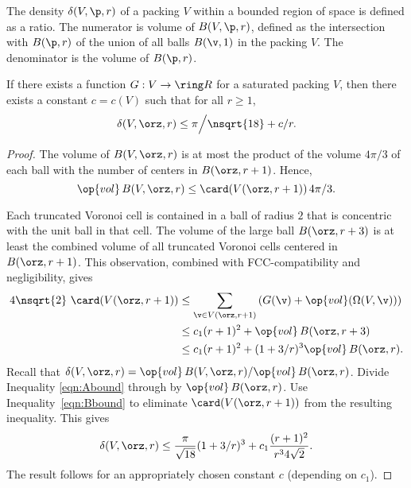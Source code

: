 \begin{cnl}
The density $\delta( V,\p,r)$ of a packing $ V$ within a bounded
region of space is defined as a ratio. The numerator is volume of
$\openBall{V}{\p,r}$, defined as the intersection with $\openBall{\p}{r}$ of the union
of all balls $\openBall{\v}{1}$ in the packing $V$.  The denominator is the volume of
$\openBall{\p}{r}$. 
%
%



\begin{lemma}
\label{lemma:reduction-finite-dimensions} %
% 
If there exists a 
 function $G: V\to\Real$ for
a saturated packing $ V$, then there exists a constant $c=c(V)$ such
that for all $r\ge1$,
\[  
\delta( V,\orz,r)
\le {\pi}\Big/{\nsqrt{18}} + c/r.
\] 
\end{lemma}


\begin{proof} 
The volume of $\openBall{ V}{\orz,r}$ is at most the product of the volume
$4\pi/3$ of each ball with the number of centers in
$\openBall{\orz}{r+1}$.  Hence,
\begin{equation} \label{eqn:Abound}
\op{vol}\, \openBall{ V}{\orz,r} \le \card( \Vee{V}(\orz,r+1))\, 4\pi/3.
\end{equation}


Each truncated Voronoi cell is contained in a ball of radius $2$ that
is concentric with the unit ball in that cell.  The volume of the
large ball $\openBall{\orz}{r+3}$ is at least the combined volume of all
truncated Voronoi cells centered in $\openBall{\orz}{r+1}$. This observation,
combined with FCC-compatibility and negligibility, gives
\begin{equation} 
\begin{split} 
4\nsqrt{2}\,\,\card( \Vee{V}(\orz,r+1))
&\le \sumfinitepred{\v}{\v\in \Vee{V}(\orz,r+1)}{\left(G(\v) +
\op{vol}(\Omega(V,\v))\right)} \\
&\le c_1 (r+1)^2 + \op{vol}\,\openBall{\orz}{r+3} \\
&\le c_1 (r+1)^2 + (1+3/r)^3 \op{vol}\,\openBall{\orz}{r}.
\label{eqn:Bbound}
\end{split}
\end{equation}
%
Recall that $\delta( V,\orz,r)=
\op{vol}\,\openBall{ V}{\orz,r}/\op{vol}\,\openBall{\orz}{r}$. Divide Inequality
\ref{eqn:Abound} through by $\op{vol}\,\openBall{\orz}{r}$.  Use
Inequality~\ref{eqn:Bbound} to eliminate $\card( \Vee{V}(\orz,r+1))$ from the
resulting inequality.  This gives
\[ \delta( V,\orz,r)
\le \frac{\pi}{\sqrt{18}} (1+3/r)^3 + c_1 \frac{(r+1)^2}{r^34\sqrt{2}}.
\] 
The result follows for an appropriately chosen constant $c$
(depending on $c_1$).
\end{proof}



\end{cnl}
